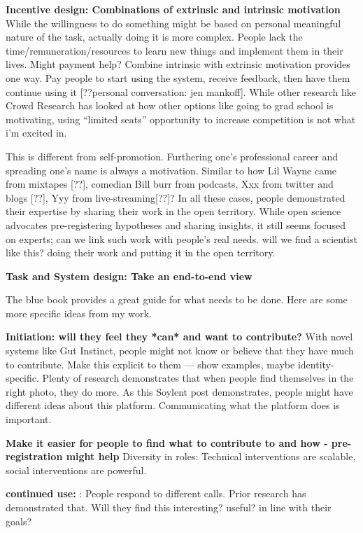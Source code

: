 \textbf{Incentive design: Combinations of extrinsic and intrinsic motivation}
While the willingness to do something might be based on personal meaningful nature of the task, actually doing it is more complex. People lack the time/remuneration/resources to learn new things and implement them in their lives. Might payment help? Combine intrinsic with extrinsic motivation provides one way. Pay people to start using the system, receive feedback, then have them continue using it [??personal conversation: jen mankoff]. While other research like Crowd Research has looked at how other options like going to grad school is motivating, using “limited seats” opportunity to increase competition is not what i’m excited in. 

This is different from self-promotion. Furthering one’s professional career and spreading one’s name is always a motivation. Similar to how Lil Wayne came from mixtapes [??], comedian Bill burr from podcasts, Xxx from twitter and blogs [??], Yyy from live-streaming[??]? In all these cases, people demonstrated their expertise by sharing their work in the open territory. While open science advocates pre-registering hypotheses and sharing insights, it still seems focused on experts; can we link such work with people’s real needs. will we find a scientist like this? doing their work and putting it in the open territory.

\textbf{Task and System design: Take an end-to-end view}

The blue book provides a great guide for what needs to be done. Here are some more specific ideas from my work.

\textbf{Initiation: will they feel they *can* and want to contribute?} With novel systems like Gut Instinct, people might not know or believe that they have much to contribute. Make this explicit to them — show examples, maybe identity-specific. Plenty of research demonstrates that when people find themselves in the right photo, they do more. As this Soylent post demonstrates, people might have different ideas about this platform. Communicating what the platform does is important.

\textbf{Make it easier for people to find what to contribute to and how - pre-registration might help} Diversity in roles: Technical interventions are scalable, social interventions are powerful. 

\textbf{continued use: }:  People respond to different calls. Prior research has demonstrated that. Will they find this interesting? useful? in line with their goals?

